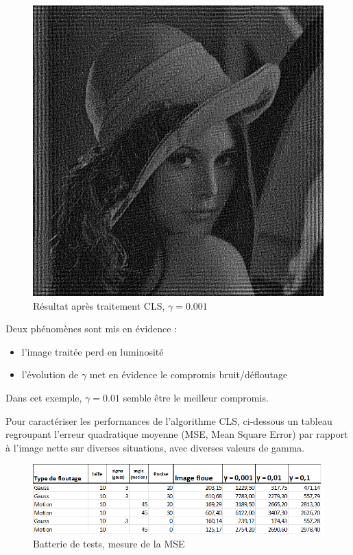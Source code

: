\documentclass{article}
\begin{document}
	\begin{figure}[!h]
	\begin{center}			
		\includegraphics[scale=0.3]{Img/MLafterg0001}
	\end{center}
	\caption{Résultat après traitement CLS, $\gamma = 0.001$}
	\end{figure}

	Deux phénomènes sont mis en évidence :
	\begin{itemize}
		\item l'image traitée perd en luminosité
		\item l'évolution de $\gamma$ met en évidence le compromis bruit/défloutage\\ 
	\end{itemize}
	
	Dans cet exemple, $\gamma = 0.01$ semble être le meilleur compromis.
	\newpage
	
	Pour caractériser les performances de l'algorithme CLS, ci-dessous un tableau regroupant l'erreur quadratique moyenne (MSE, Mean Square Error) par rapport à l'image nette sur diverses situations, avec diverses valeurs de gamma.
	
	\begin{figure}[!h]
		\begin{center}			
			\includegraphics[scale=0.4]{Img/tabmse}
		\end{center}
		\caption{Batterie de tests, mesure de la MSE}
	\end{figure}
	
\end{document}
